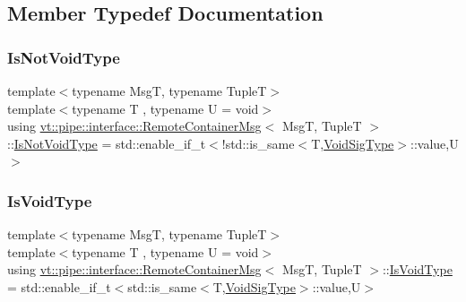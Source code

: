 \subsection{Member Typedef Documentation}
\mbox{\label{structvt_1_1pipe_1_1interface_1_1_remote_container_msg_ab12f66d491cc0783269a302390f76a1d}} 
\subsubsection{\texorpdfstring{Is\+Not\+Void\+Type}{IsNotVoidType}}
{\footnotesize\ttfamily template$<$typename MsgT, typename TupleT$>$ \\
template$<$typename T , typename U  = void$>$ \\
using \hyperlink{structvt_1_1pipe_1_1interface_1_1_remote_container_msg}{vt\+::pipe\+::interface\+::\+Remote\+Container\+Msg}$<$ MsgT, TupleT $>$\+::\hyperlink{structvt_1_1pipe_1_1interface_1_1_remote_container_msg_ab12f66d491cc0783269a302390f76a1d}{Is\+Not\+Void\+Type} =  std\+::enable\+\_\+if\+\_\+t$<$!std\+::is\+\_\+same$<$T,\hyperlink{structvt_1_1pipe_1_1interface_1_1_remote_container_msg_ae2139dd54fd8fb4bf561241bf03b56ec}{Void\+Sig\+Type}$>$\+::value,U$>$}

\mbox{\label{structvt_1_1pipe_1_1interface_1_1_remote_container_msg_af3f6ea130372986d8d0b4c39f35f59b6}} 
\subsubsection{\texorpdfstring{Is\+Void\+Type}{IsVoidType}}
{\footnotesize\ttfamily template$<$typename MsgT, typename TupleT$>$ \\
template$<$typename T , typename U  = void$>$ \\
using \hyperlink{structvt_1_1pipe_1_1interface_1_1_remote_container_msg}{vt\+::pipe\+::interface\+::\+Remote\+Container\+Msg}$<$ MsgT, TupleT $>$\+::\hyperlink{structvt_1_1pipe_1_1interface_1_1_remote_container_msg_af3f6ea130372986d8d0b4c39f35f59b6}{Is\+Void\+Type} =  std\+::enable\+\_\+if\+\_\+t$<$std\+::is\+\_\+same$<$T,\hyperlink{structvt_1_1pipe_1_1interface_1_1_remote_container_msg_ae2139dd54fd8fb4bf561241bf03b56ec}{Void\+Sig\+Type}$>$\+::value,U$>$}

